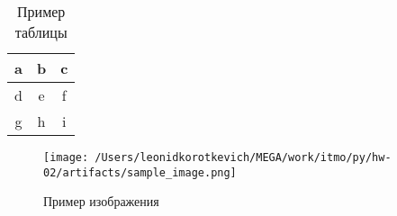 \documentclass{article}
\begin{document}
    \begin{table}[h!]
    \centering
    \caption{Пример таблицы}
    \begin{tabular}{|c|c|c|}
\hline
a & b & c \\
\hline
d & e & f \\
\hline
g & h & i \\
\hline
\end{tabular}
    \end{table}

    \begin{figure}[h!]
    \centering
    \texttt{[image: /Users/leonidkorotkevich/MEGA/work/itmo/py/hw-02/artifacts/sample\_image.png]}
    \caption{Пример изображения}
    \end{figure}

    
\end{document}
